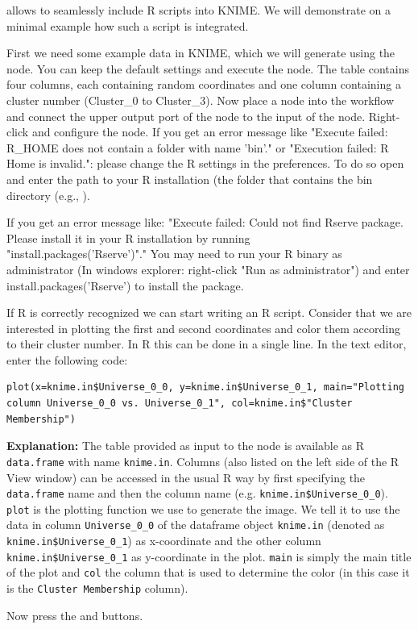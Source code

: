  allows to seamlessly include R scripts into KNIME. We will demonstrate on a minimal 
example how such a script is integrated.

\begin{task}
First we need some example data in KNIME, which we will generate using the  node. You can 
keep the default settings and execute the node. The table contains four columns, each containing random coordinates 
and one column containing a cluster number (Cluster\_0 to Cluster\_3). Now place a  node 
into the workflow and connect the upper output port of the  node to the input of the 
 node. Right-click and configure the node.
If you get an error message like "Execute failed: R\_HOME does not contain a folder with name 'bin'." or "Execution 
failed: R Home is invalid.": please change the R settings in the preferences. To do so open  and enter the path to your R installation (the folder that contains the bin directory (e.g., ).

If you get an error message like:
"Execute failed: Could not find Rserve package. Please install it in your R installation by running \\ 
"install.packages('Rserve')"." You may need to run your R binary as administrator (In windows explorer: right-click 
"Run as administrator") and enter install.packages('Rserve') to install the package.

If R is correctly recognized we can start writing an R script. Consider that we are interested in plotting the first 
and second coordinates and color them according to their cluster number. In R this can be done in a single line.
In the  text editor, enter the following code:
\begin{lstlisting}
plot(x=knime.in$Universe_0_0, y=knime.in$Universe_0_1, main="Plotting column Universe_0_0 vs. Universe_0_1", col=knime.in$"Cluster Membership")
\end{lstlisting}
        
\textbf{Explanation:}
The table provided as input to the  node is available as R \texttt{data.frame} with name 
\texttt{knime.in}. Columns (also listed on the left side of the R View window) can be accessed in the usual R way by 
first specifying the \texttt{data.frame} name and then the column name (e.g. \texttt{knime.in\$Universe\_0\_0}).
\texttt{plot} is the plotting function we use to generate the image. We tell it to use the data in column 
\texttt{Universe\_0\_0} of the dataframe object \texttt{knime.in} (denoted as \texttt{knime.in\$Universe\_0\_1}) as 
x-coordinate and the other column \texttt{knime.in\$Universe\_0\_1} as y-coordinate in the plot. \texttt{main} is 
simply the main title of the plot and \texttt{col} the column that is used to determine the color (in this case it is 
the \texttt{Cluster Membership} column).

Now press the  and  buttons.
\end{task}

